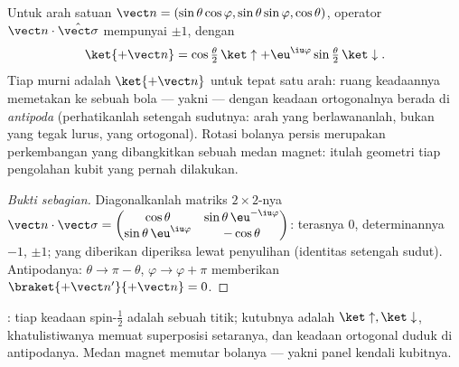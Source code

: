 \begin{proposition}\label{prop:b3:spin-two-level:bloch}
Untuk arah satuan $\vect n = (\sin\theta\cos\varphi,
\sin\theta\sin\varphi, \cos\theta)$, operator $\vect
n\cdot\hat{\vect\sigma}$ mempunyai  $\pm1$, dengan
\[
\ket{+\vect n} = \cos\tfrac\theta2\,\ket\uparrow +
\eu^{\iu\varphi}\sin\tfrac\theta2\,\ket\downarrow .
\]
Tiap  murni adalah $\ket{+\vect n}$ untuk tepat satu arah: ruang
keadaannya memetakan ke sebuah bola --- yakni \emph{} ---
dengan keadaan ortogonalnya berada di \emph{antipoda} (perhatikanlah
setengah sudutnya: arah yang berlawananlah, bukan yang tegak lurus,
yang ortogonal). Rotasi bolanya persis merupakan perkembangan yang
dibangkitkan sebuah medan magnet: itulah geometri tiap pengolahan kubit
yang pernah dilakukan.
\end{proposition}

\begin{proof}[Bukti sebagian]
Diagonalkanlah matriks $2\times2$-nya $\vect n\cdot\vect\sigma =
\begin{pmatrix}\cos\theta & \sin\theta\,\eu^{-\iu\varphi}\\
\sin\theta\,\eu^{\iu\varphi} & -\cos\theta\end{pmatrix}$: terasnya $0$,
determinannya $-1$,  $\pm1$;  yang diberikan
diperiksa lewat penyulihan (identitas setengah sudut). Antipodanya:
$\theta \to \pi -
\theta$, $\varphi \to \varphi + \pi$ memberikan $\braket{+\vect
n'}{+\vect n} = 0$.
\end{proof}

\begin{omfigure}

{\small {}: tiap keadaan spin-$\tfrac12$ adalah sebuah titik;
kutubnya adalah $\ket\uparrow, \ket\downarrow$, khatulistiwanya memuat
superposisi setaranya, dan keadaan ortogonal duduk di antipodanya. Medan
magnet memutar bolanya --- yakni panel kendali kubitnya.}
\end{omfigure}


